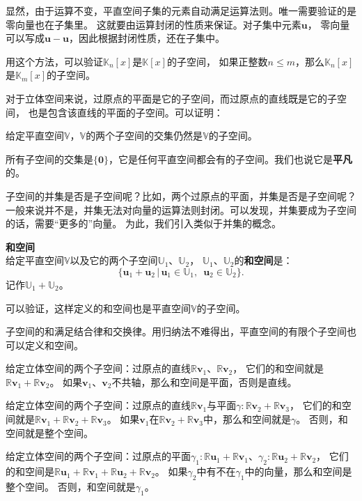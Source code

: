 \documentclass[12pt,UTF8]{ctexbook}
\begin{document}
显然，由于运算不变，平直空间子集的元素自动满足运算法则。唯一需要验证的是零向量也在子集里。
这就要由运算封闭的性质来保证。对子集中元素$\mathbf{u}$，
零向量可以写成$\mathbf{u} - \mathbf{u}$，因此根据封闭性质，还在子集中。

用这个方法，可以验证$\mathbb{K}_n[x]$是$\mathbb{K}[x]$的子空间，
如果正整数$n\leqslant m$，那么$\mathbb{K}_n[x]$是$\mathbb{K}_m[x]$的子空间。

对于立体空间来说，过原点的平面是它的子空间，而过原点的直线既是它的子空间，
也是包含该直线的平面的子空间。可以证明：

\begin{tm}
    给定平直空间$\mathbb{V}$，$\mathbb{V}$的两个子空间的交集仍然是$\mathbb{V}$的子空间。
\end{tm}

所有子空间的交集是$\{\mathbf{0}\}$，它是任何平直空间都会有的子空间。我们也说它是\textbf{平凡}的。

子空间的并集是否是子空间呢？比如，两个过原点的平面，并集是否是子空间呢？
一般来说并不是，并集无法对向量的运算法则封闭。可以发现，并集要成为子空间的话，需要“更多的”向量。
为此，我们引入类似于并集的概念。

\begin{df}{\textbf{和空间}}
    \mbox{} \\
    给定平直空间$\mathbb{V}$以及它的两个子空间$\mathbb{U}_1$、$\mathbb{U}_2$，
    $\mathbb{U}_1$、$\mathbb{U}_2$的\textbf{和空间}是：
    $$ \{ \mathbf{u}_1 + \mathbf{u}_2\,|\, \mathbf{u}_1 \in \mathbb{U}_1,\,\,\, \mathbf{u}_2 \in \mathbb{U}_2\}.$$
    记作$\mathbb{U}_1 + \mathbb{U}_2$。
\end{df}
可以验证，这样定义的和空间也是平直空间$\mathbb{V}$的子空间。

子空间的和满足结合律和交换律。用归纳法不难得出，平直空间的有限个子空间也可以定义和空间。

给定立体空间的两个子空间：过原点的直线$\mathbb{R}\mathbf{v}_1$、$\mathbb{R}\mathbf{v}_2$，
它们的和空间就是$\mathbb{R}\mathbf{v}_1 + \mathbb{R}\mathbf{v}_2$。
如果$\mathbf{v}_1$、$\mathbf{v}_2$不共轴，那么和空间是平面，否则是直线。

给定立体空间的两个子空间：过原点的直线$\mathbb{R}\mathbf{v}_1$与平面$\gamma: \mathbb{R}\mathbf{v}_2 + \mathbb{R}\mathbf{v}_3$，
它们的和空间就是$\mathbb{R}\mathbf{v}_1 + \mathbb{R}\mathbf{v}_2 + \mathbb{R}\mathbf{v}_3$。
如果$\mathbf{v}_1$在$\mathbb{R}\mathbf{v}_2 + \mathbb{R}\mathbf{v}_3$中，那么和空间就是$\gamma$。
否则，和空间就是整个空间。

给定立体空间的两个子空间：过原点的平面$\gamma_1: \mathbb{R}\mathbf{u}_1 + \mathbb{R}\mathbf{v}_1$、$\gamma_2: \mathbb{R}\mathbf{u}_2 + \mathbb{R}\mathbf{v}_2$，
它们的和空间是$\mathbb{R}\mathbf{u}_1 + \mathbb{R}\mathbf{v}_1 + \mathbb{R}\mathbf{u}_2 + \mathbb{R}\mathbf{v}_2$。
如果$\gamma_2$中有不在$\gamma_1$中的向量，那么和空间是整个空间。
否则，和空间就是$\gamma_1$。
\end{document}
